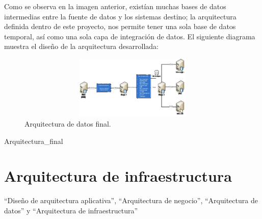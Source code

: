 Como se observa en la imagen anterior, existían muchas bases de datos
intermedias entre la fuente de datos y los sistemas destino; la arquitectura
definida dentro de este proyecto, nos permite tener una sola base de datos
temporal, así como una sola capa de integración de datos. El siguiente diagrama
muestra el diseño de la arquitectura desarrollada:

\begin{figure}[htb]
  \begin{center}
    \includegraphics[width=12cm, height=3cm, scale=0.5]{Arquitectura_final.jpg}
    \caption{Arquitectura de datos final.}
    \label{fig:arquitectura-de-datos-final}
  \end{center}
\end{figure}

Arquitectura\_final %

\section{Arquitectura de infraestructura}

``Diseño de arquitectura aplicativa'', ``Arquitectura de negocio'',
``Arquitectura de datos'' y ``Arquitectura de infraestructura''

\cleardoublepage

